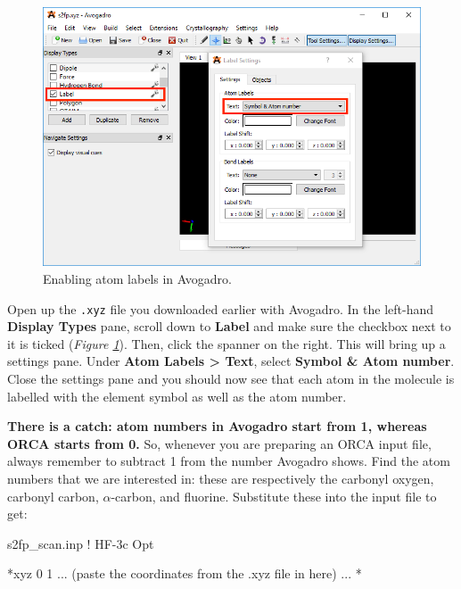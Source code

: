 \documentclass[10pt]{article}
\newcommand{\figref}[1]{\textit{Figure \ref{fig:#1}}}
\begin{document}
\begin{figure}[H]
    \centering
    \includegraphics[scale=0.5]{./img/avolabel}
    \caption{Enabling atom labels in Avogadro.}
    \label{fig:avolabel}
\end{figure}

Open up the \texttt{.xyz} file you downloaded earlier with Avogadro. In the left-hand \textbf{Display Types} pane, scroll down to \textbf{Label} and make sure the checkbox next to it is ticked (\figref{avolabel}). Then, click the spanner on the right. This will bring up a settings pane. Under \textbf{Atom Labels > Text}, select \textbf{Symbol \& Atom number}. Close the settings pane and you should now see that each atom in the molecule is labelled with the element symbol as well as the atom number.

\textbf{There is a catch: atom numbers in Avogadro start from 1, whereas ORCA starts from 0.} So, whenever you are preparing an ORCA input file, always remember to subtract 1 from the number Avogadro shows. Find the atom numbers that we are interested in: these are respectively the carbonyl oxygen, carbonyl carbon, $\alpha$-carbon, and fluorine. Substitute these into the input file to get:

\begin{script}{s2fp\_scan.inp}
! HF-3c Opt



*xyz 0 1
 ... (paste the coordinates from the .xyz file in here) ...
*
\end{script}
\end{document}
